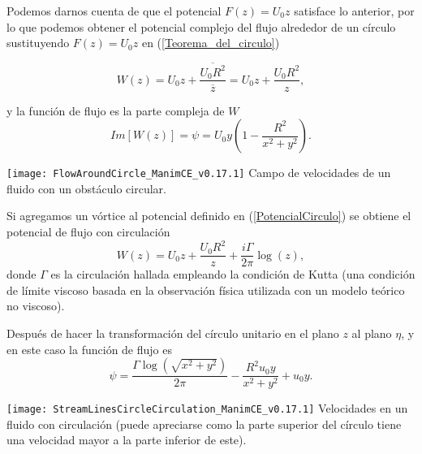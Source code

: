 \documentclass[portrait]{Hylangtechposter}
\begin{document}
\begin{multicols}{2}
  \noindent Podemos darnos cuenta de que el potencial $F(z)= U_0 z$ satisface lo anterior, por lo que podemos obtener el potencial complejo  del flujo alrededor de un círculo sustituyendo $F(z)= U_0 z$ en (\ref{Teorema_del_circulo}) 

		\begin{equation}
			W(z) = U_0 z + \frac{\overline{U_0 R^2} }{\overline{z} } = U_0 z +\frac{U_0 R^2}{z} ,
			\label{PotencialCirculo}
		\end{equation}

		\noindent y la función de flujo es la parte compleja de $W$ 
		\begin{equation*}
			Im[W(z)]=\psi =  U_0 y \left( 1- \frac{R^2}{x^2 + y^2}\right).
			\label{Potencial}
		\end{equation*}
			\begin{center}\vspace{0.5cm}
\texttt{[image: FlowAroundCircle\_ManimCE\_v0.17.1]}
 {Campo de velocidades de un fluido con un obstáculo circular.}
\end{center}\vspace{0.5cm}
Si agregamos un vórtice al potencial definido en (\ref{PotencialCirculo}) se obtiene el potencial de flujo con circulación
			\begin{equation}
				W(z) = U_0z + \frac{ U_0R^2}{z} + \frac{i \Gamma}{2 \pi}\log (z),
			\end{equation}
			donde  $\Gamma$ es la circulación hallada empleando la condición de Kutta (una condición de límite viscoso basada en la observación física utilizada con un modelo teórico no viscoso).

			
			Después de hacer la transformación del círculo unitario en el plano $z$ al plano $\eta$, y en este caso la función de flujo es 
			\begin{equation*}
				\psi = \frac{\Gamma \log{\left(\sqrt{x^{2} + y^{2}} \right)}}{2 \pi} - \frac{R^{2} u_{0} y}{x^{2} + y^{2}} + u_{0} y.
			\end{equation*}
\begin{center}\vspace{0.5cm}
\texttt{[image: StreamLinesCircleCirculation\_ManimCE\_v0.17.1]}
 {Velocidades en un fluido con circulación (puede apreciarse como la parte
superior del círculo tiene una velocidad mayor a la parte inferior de este).}
\end{center}\vspace{0.5cm}


\end{multicols}
\end{document}
